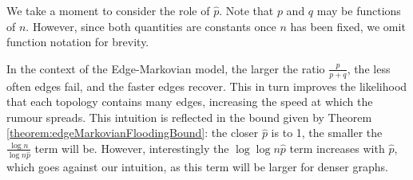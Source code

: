 We take a moment to consider the role of $\hat{p}$. Note that $p$ and $q$ may be functions of $n$. However, since both quantities are constants once $n$ has been fixed, we omit function notation for brevity.

In the context of the Edge-Markovian model, the larger the ratio $\frac{p}{p+q}$, the less often edges fail, and the faster edges recover.
This in turn improves the likelihood that each topology contains many edges, increasing the speed at which the rumour spreads. This intuition is reflected in the bound given by Theorem \ref{theorem:edgeMarkovianFloodingBound}: the closer $\hat{p}$ is to 1, the smaller the $\frac{\log n}{\log n \hat{p}}$ term will be. However, interestingly the $\log \log n \hat{p}$ term increases with $\hat{p}$, which goes against our intuition, as this term will be larger for denser graphs. 


